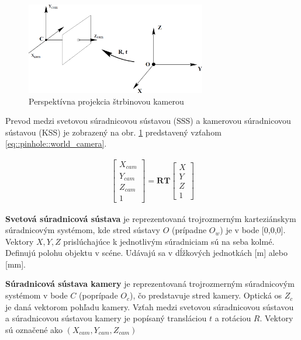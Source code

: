 \begin{figure}[h]
	\centering
	\includegraphics[width=0.7\textwidth]{figures/rotat_translat.jpg} 
	\caption{Perspektívna projekcia štrbinovou kamerou}
	\label{fig:rotat_translat}
\end{figure}

Prevod medzi svetovou súradnicovou sústavou (SSS) a kamerovou súradnicovou sústavou (KSS) je zobrazený na obr. \ref{fig:rotat_translat} predstavený vzťahom \ref{eq::pinhole::world_camera}.\newline 

\begin{equation}
\label{eq::pinhole::world_camera}
\begin{aligned}
\begin{bmatrix}
X_{cam} \\ Y_{cam} \\ Z_{cam} \\ 1
\end{bmatrix}=
\boldsymbol{RT}
\begin{bmatrix}
X \\ Y \\ Z \\ 1
\end{bmatrix}
\end{aligned}
\end{equation}

\newpage
\textbf{Svetová súradnicová sústava} je reprezentovaná trojrozmerným karteziánskym súradnicovým systémom, kde stred sústavy $O$ (prípadne $O_w$) je v bode [0,0,0]. Vektory $X,Y,Z$ prislúchajúce k jednotlivým súradniciam sú na seba kolmé. Definujú polohu objektu v scéne. Udávajú sa v dĺžkových jednotkách [m] alebo [mm].\newline 

\textbf{Súradnicová sústava kamery} je reprezentovaná trojrozmerným súradnicovým systémom v bode $C$ (poprípade $O_c$), čo predstavuje stred kamery. Optická os $Z_c$ je daná vektorom pohľadu kamery. Vzťah medzi svetovou súradnicovou sústavou a súradnicovou sústavou kamery je popísaný transláciou $t$ a rotáciou $R$. Vektory sú označené ako $(X_{cam},Y_{cam},Z_{cam})$ \newline 

